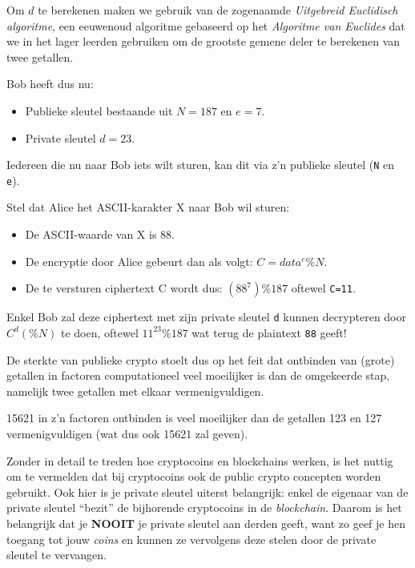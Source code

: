 \documentclass[
  10pt,
  dutch,
  paper=a4,
  ,captions=tableheading
]{scrbook}
\providecommand{\tightlist}{%
  \setlength{\itemsep}{0pt}\setlength{\parskip}{0pt}}
\begin{document}
\begin{tipblock}
Om \(d\) te berekenen maken we gebruik van de zogenaamde
\emph{Uitgebreid Euclidisch algoritme}, een eeuwenoud algoritme
gebaseerd op het \emph{Algoritme van Euclides} dat we in het lager
leerden gebruiken om de grootste gemene deler te berekenen van twee
getallen.
\end{tipblock}

Bob heeft dus nu:

\begin{itemize}
\tightlist
\item
  Publieke sleutel bestaande uit \(N=187\) en \(e=7\).
\item
  Private sleutel \(d=23\).
\end{itemize}

Iedereen die nu naar Bob iets wilt sturen, kan dit via z'n publieke
sleutel (\texttt{N} en \texttt{e}).

Stel dat Alice het ASCII-karakter X naar Bob wil sturen:

\begin{itemize}
\tightlist
\item
  De ASCII-waarde van X is 88.
\item
  De encryptie door Alice gebeurt dan als volgt: \(C = data^e\%N\).
\item
  De te versturen ciphertext C wordt dus: \((88^7)\%187\) oftewel
  \texttt{C=11}.
\end{itemize}

Enkel Bob zal deze ciphertext met zijn private sleutel \texttt{d} kunnen
decrypteren door \(C^d(\%N)\) te doen, oftewel \(11^{23}\%187\) wat
terug de plaintext \texttt{88} geeft!

\begin{tipblock}
De sterkte van publieke crypto stoelt dus op het feit dat ontbinden van
(grote) getallen in factoren computationeel veel moeilijker is dan de
omgekeerde stap, namelijk twee getallen met elkaar vermenigvuldigen.

15621 in z'n factoren ontbinden is veel moeilijker dan de getallen 123
en 127 vermenigvuldigen (wat dus ook 15621 zal geven).
\end{tipblock}

Zonder in detail te treden hoe cryptocoins en blockchains werken, is het
nuttig om te vermelden dat bij cryptocoins ook de public crypto
concepten worden gebruikt. Ook hier is je private sleutel uiterst
belangrijk: enkel de eigenaar van de private sleutel ``bezit'' de
bijhorende cryptocoins in de \emph{blockchain}. Daarom is het belangrijk
dat je \textbf{NOOIT} je private sleutel aan derden geeft, want zo geef
je hen toegang tot jouw \emph{coins} en kunnen ze vervolgens deze stelen
door de private sleutel te vervangen.
\end{document}
